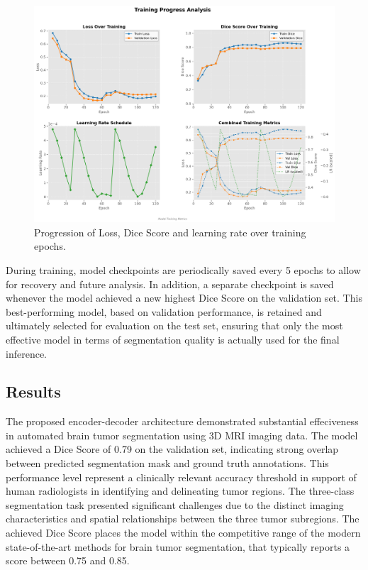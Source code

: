 \documentclass[10pt,twocolumn,letterpaper]{article}
\begin{document}
\begin{figure}[H]
    \centering
    \includegraphics[width=\linewidth]{img/training4mb.png}
    \caption{Progression of Loss, Dice Score and learning rate over training epochs.}
\end{figure}

During training, model checkpoints are periodically saved every 5 epochs to allow for recovery and future analysis. In addition, a separate checkpoint is saved whenever the model achieved a new highest Dice Score on the validation set. This best-performing model, based on validation performance, is retained and ultimately selected for evaluation on the test set, ensuring that only the most effective model in terms of segmentation quality is actually used for the final inference.


\subsection{Results}
The proposed encoder-decoder architecture demonstrated substantial effeciveness in automated brain tumor segmentation using 3D MRI imaging data. The model achieved a Dice Score of 0.79 on the validation set, indicating strong overlap between predicted segmentation mask and ground truth annotations. This performance level represent a clinically relevant accuracy threshold in support of human radiologists in identifying and delineating tumor regions.
The three-class segmentation task presented significant challenges due to the distinct imaging characteristics and spatial relationships between the three tumor subregions.
The achieved Dice Score places the model within the competitive range of the modern state-of-the-art methods for brain tumor segmentation, that typically reports a score between 0.75 and 0.85.
\end{document}
